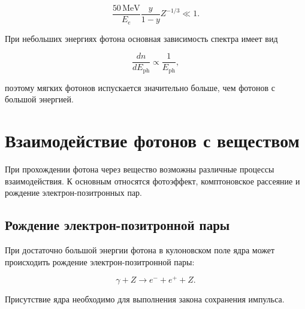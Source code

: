 \documentclass[../final.tex]{subfiles}
\begin{document}
\begin{equation*}
    \frac{50\,\mathrm{MeV}}{E_e}
    \frac{y}{1-y}
    Z^{-1/3}
    \ll
    1.
\end{equation*}

При небольших энергиях фотона основная зависимость спектра имеет вид

\begin{equation*}
    \frac{dn}{dE_{\mathrm{ph}}}
    \propto
    \frac{1}{E_{\mathrm{ph}}},
\end{equation*}

поэтому мягких фотонов испускается значительно больше,
чем фотонов с большой энергией.


\section{Взаимодействие фотонов с веществом}

При прохождении фотона через вещество возможны различные процессы
взаимодействия. К основным относятся фотоэффект,
комптоновское рассеяние и рождение электрон-позитронных пар.


\subsection{Рождение электрон-позитронной пары}

При достаточно большой энергии фотона в кулоновском поле ядра
может происходить рождение электрон-позитронной пары:

\begin{equation*}
    \gamma+Z
    \rightarrow
    e^-+e^++Z.
\end{equation*}

Присутствие ядра необходимо для выполнения закона сохранения импульса.
\end{document}
